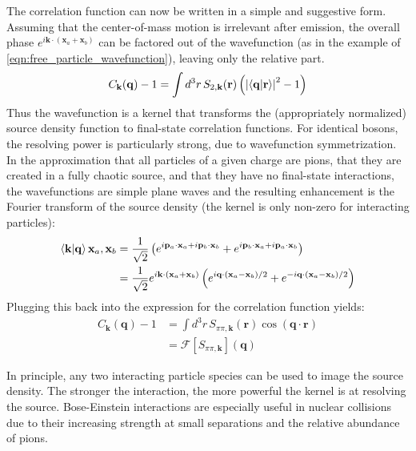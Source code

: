 The correlation function can now be written in a simple and suggestive form.
Assuming that the center-of-mass motion is irrelevant after emission, the overall phase $e^{i\mathbf{k}\cdot(\mathbf{x}_a+\mathbf{x}_b)}$ can be factored out of the wavefunction (as in the example of \cref{eqn:free_particle_wavefunction}), leaving only the relative part.
\begin{equation} \label{eq:wavefunction_kernel}
C_\mathbf{k}(\mathbf{q}) - 1 = \int d^3 r \, S_{2,\mathbf{k}}(\mathbf{r}) \left(\left|\braket{\mathbf{q}|\mathbf{r}}\right|^2 - 1 \right)
\end{equation}
Thus the wavefunction is a kernel that transforms the (appropriately normalized) source density function to final-state correlation functions.
For identical bosons, the resolving power is particularly strong, due to wavefunction symmetrization.
In the approximation that all particles of a given charge are pions, that they are created in a fully chaotic source, and that they have no final-state interactions, the wavefunctions are simple plane waves and the resulting enhancement is the Fourier transform of the source density (the kernel is only non-zero for interacting particles):
\begin{align}
\braket{\mathbf{k}|\mathbf{q}}{\mathbf{x}_a, \mathbf{x}_b} &= \frac{1}{\sqrt{2}}\left(e^{i\mathbf{p}_a \cdot \mathbf{x}_a + i\mathbf{p}_b \cdot \mathbf{x}_b} + e^{i\mathbf{p}_b \cdot \mathbf{x}_a + i\mathbf{p}_a \cdot \mathbf{x}_b}\right)\\
&= \frac{1}{\sqrt{2}}e^{i\mathbf{k} \cdot (\mathbf{x}_a+ \mathbf{x}_b)}\left(e^{i\mathbf{q} \cdot (\mathbf{x}_a - \mathbf{x}_b)/2} + e^{- i\mathbf{q} \cdot (\mathbf{x}_a - \mathbf{x}_b)/2}\right) \label{eqn:free_particle_wavefunction}
\end{align}
Plugging this back into the expression for the correlation function yields:
\begin{align}
C_{\mathbf{k}}(\mathbf{q}) - 1 &= \int d^3 r \, S_{\pi\pi,\mathbf{k}}(\mathbf{r}) \cos\left(\mathbf{q}\cdot\mathbf{r}\right)
\\&= \mathcal{F}\left[{S}_{\pi\pi,\mathbf{k}}\right] (\mathbf{q})
\end{align}

In principle, any two interacting particle species can be used to image the source density.
The stronger the interaction, the more powerful the kernel is at resolving the source.
Bose-Einstein interactions are especially useful in nuclear collisions due to their increasing strength at small separations and the relative abundance of pions.


